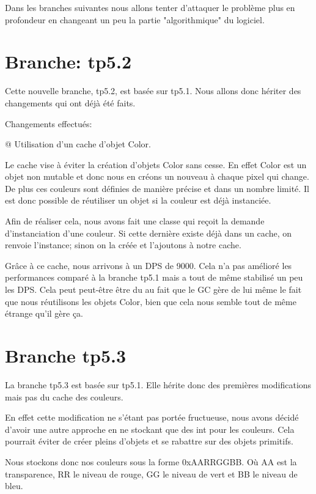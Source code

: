 \documentclass{report}
\begin{document}
		Dans les branches suivantes nous allons tenter d'attaquer le problème plus en profondeur en changeant un peu la partie "algorithmique" du logiciel.
		
	\chapter{Branche: tp5.2}
		Cette nouvelle branche, tp5.2, est basée sur tp5.1.
		Nous allons donc hériter des changements qui ont déjà été faits.
	
		Changements effectués:
		\begin{easylist}[itemize]
			@ Utilisation d'un cache d'objet Color.
		\end{easylist}
		
		Le cache vise à éviter la création d'objets Color sans cesse.
		En effet Color est un objet non mutable et donc nous en créons un nouveau à chaque pixel qui change.
		De plus ces couleurs sont définies de manière précise et dans un nombre limité.
		Il est donc possible de réutiliser un objet si la couleur est déjà instanciée.
		
		Afin de réaliser cela, nous avons fait une classe qui reçoit la demande d'instanciation d'une couleur.
		Si cette dernière existe déjà dans un cache, on renvoie l'instance; sinon on la créée et l'ajoutons à notre cache.
		
		Grâce à ce cache, nous arrivons à un DPS de 9000.
		Cela n'a pas amélioré les performances comparé à la branche tp5.1 mais a tout de même stabilisé un peu les DPS.
		Cela peut peut-être être du au fait que le GC gère de lui même le fait que nous réutilisons les objets Color, bien que cela nous semble tout de même étrange qu'il gère ça.
		
	\chapter{Branche tp5.3}
		La branche tp5.3 est basée sur tp5.1.
		Elle hérite donc des premières modifications mais pas du cache des couleurs.
		
		En effet cette modification ne s'étant pas portée fructueuse, nous avons décidé d'avoir une autre approche en ne stockant que des int pour les couleurs.
		Cela pourrait éviter de créer pleins d'objets et se rabattre sur des objets primitifs.

		Nous stockons donc nos couleurs sous la forme 0xAARRGGBB. Où AA est la transparence, RR le niveau de rouge, GG le niveau de vert et BB le niveau de bleu.
		
\end{document}

